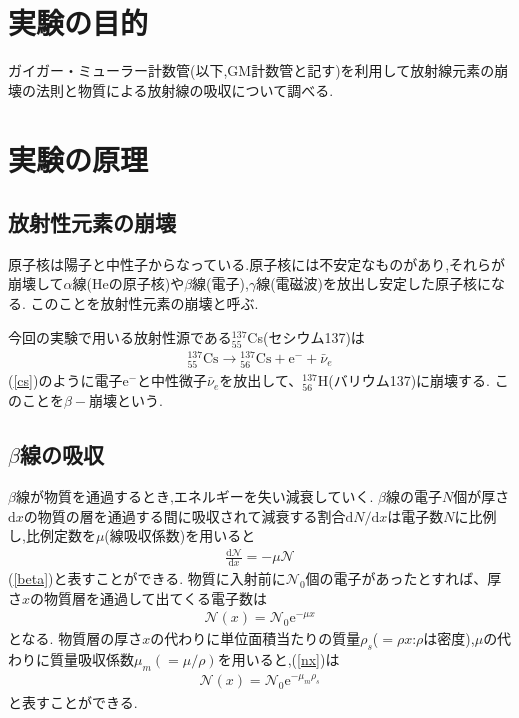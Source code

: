 \documentclass[a4j,10pt]{jarticle}
\begin{document}
  \section{実験の目的}
  ガイガー・ミューラー計数管(以下,GM計数管と記す)を利用して放射線元素の崩壊の法則と物質による放射線の吸収について調べる.
  \section{実験の原理}
  \subsection{放射性元素の崩壊}
  原子核は陽子と中性子からなっている.原子核には不安定なものがあり,それらが崩壊して$\alpha$線(Heの原子核)や$\beta$線(電子),$\gamma$線(電磁波)を放出し安定した原子核になる.
  このことを放射性元素の崩壊と呼ぶ.

  今回の実験で用いる放射性源である${}^{137}_{55}$Cs(セシウム137)は
  \begin{eqnarray}
    \label{cs}
    {}_{55}^{137}\mathrm{Cs} \rightarrow {}_{56}^{137}\mathrm{Cs} + \mathrm{e}^{-} + \bar{\nu}_e
  \end{eqnarray}
  (\ref{cs})のように電子$\mathrm{e}^{-}$と中性微子$\bar{\nu}_e$を放出して、${}_{56}^{137}$H(バリウム137)に崩壊する.
  このことを$\beta-$崩壊という.

  \subsection{$\beta$線の吸収}
  $\beta$線が物質を通過するとき,エネルギーを失い減衰していく.
  $\beta$線の電子$N$個が厚さ$\mathrm{d}x$の物質の層を通過する間に吸収されて減衰する割合$\mathrm{d}N/\mathrm{d}x$は電子数$N$に比例し,比例定数を$\mu$(線吸収係数)を用いると
  \begin{eqnarray}
    \label{beta}
    \frac{\mathrm{d}\mathcal{N}}{\mathrm{d}x}　= -\mu \mathcal{N}
  \end{eqnarray}
  (\ref{beta})と表すことができる.
  物質に入射前に$\mathcal{N}_0$個の電子があったとすれば、厚さ$x$の物質層を通過して出てくる電子数は
  \begin{eqnarray}
    \label{nx}
    \mathcal{N}(x)=\mathcal{N}_0 \mathrm{e}^{-\mu x}
  \end{eqnarray}
  となる.
  物質層の厚さ$x$の代わりに単位面積当たりの質量$\rho_s$($=\rho x$:$\rho$は密度),$\mu$の代わりに質量吸収係数$\mu_m(=\mu/\rho)$を用いると,(\ref{nx})は
  \begin{eqnarray}
    \mathcal{N}(x)=\mathcal{N}_0 \mathrm{e}^{-\mu_m \rho_s}
  \end{eqnarray}
  と表すことができる.
\end{document}
